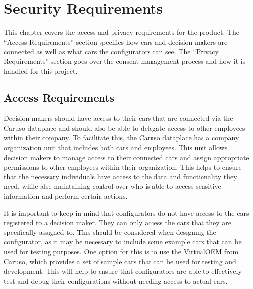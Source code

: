 \chapter{Security Requirements}

This chapter covers the access and privacy requirements for the product. The \enquote{Access Requirements} section specifies how cars and decision makers are connected as well as what cars the configurators can see. The \enquote{Privacy Requirements} section goes over the consent management process and how it is handled for this project.

\section{Access Requirements}

Decision makers should have access to their cars that are connected via the Caruso dataplace and should also be able to delegate access to other employees within their company. To facilitate this, the Caruso dataplace has a company organization unit that includes both cars and employees. This unit allows decision makers to manage access to their connected cars and assign appropriate permissions to other employees within their organization. This helps to ensure that the necessary individuals have access to the data and functionality they need, while also maintaining control over who is able to access sensitive information and perform certain actions.

It is important to keep in mind that configurators do not have access to the cars registered to a decision maker. They can only access the cars that they are specifically assigned to. This should be considered when designing the configurator, as it may be necessary to include some example cars that can be used for testing purposes. One option for this is to use the VirtualOEM from Caruso, which provides a set of sample cars that can be used for testing and development. This will help to ensure that configurators are able to effectively test and debug their configurations without needing access to actual cars.

